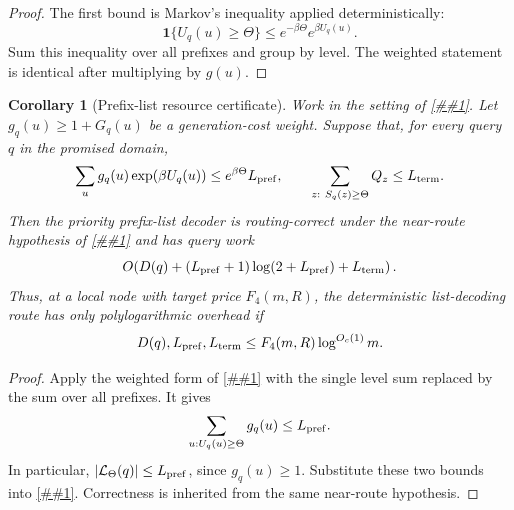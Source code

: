 \documentclass[10pt]{article}
\newcommand{\cref}[1]{\ref{##1}}
\newtheorem{corollary}[theorem]{Corollary}
\theoremstyle{definition}
\begin{document}
\begin{proof}
   The first bound is Markov's inequality applied deterministically:
   \[
      \mathbf 1\{U_q(u)\ge\Theta\}
      \le e^{-\beta\Theta}e^{\beta U_q(u)}.
   \]
   Sum this inequality over all prefixes and group by level.  The weighted
   statement is identical after multiplying by \(g(u)\).
\end{proof}

\begin{corollary}[Prefix-list resource certificate]
   \label{cor:prefix-list-resources}
   Work in the setting of \cref{lem:priority-prefix-list-decoder}.  Let
   \(g_q(u)\ge1+G_q(u)\) be a generation-cost weight.  Suppose that, for every
   query \(q\) in the promised domain,
   \[
      \sum_u g_q(u)\exp(\beta U_q(u))
      \le
      e^{\beta\Theta}L_{\rm pref},
      \qquad
      \sum_{z:\ S_q(z)\ge\Theta}Q_z\le L_{\rm term}.
   \]
   Then the priority prefix-list decoder is routing-correct under the near-route
   hypothesis of \cref{lem:prefix-list-decoder} and has query work
   \[
      O\!\left(
         D(q)
         +(L_{\rm pref}+1)\log(2+L_{\rm pref})
         +L_{\rm term}
      \right).
   \]
   Thus, at a local node with target price \(F_4(m,R)\), the deterministic
   list-decoding route has only polylogarithmic overhead if
   \[
      D(q),L_{\rm pref},L_{\rm term}
      \le F_4(m,R)\log^{O_c(1)}m .
   \]
\end{corollary}

\begin{proof}
   Apply the weighted form of \cref{lem:exponential-list-size} with the single
   level sum replaced by the sum over all prefixes.  It gives
   \[
      \sum_{u:U_q(u)\ge\Theta}g_q(u)\le L_{\rm pref}.
   \]
   In particular, \(|\mathcal L_\Theta(q)|\le L_{\rm pref}\), since
   \(g_q(u)\ge1\).  Substitute these two bounds into
   \cref{lem:priority-prefix-list-decoder}.  Correctness is inherited from the
   same near-route hypothesis.
\end{proof}
\end{document}
